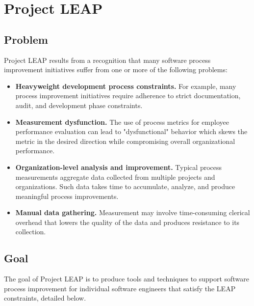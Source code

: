 
\chapter{Project LEAP}
\label{sec:LEAP}

\section{Problem}
Project LEAP results from a recognition that many software
process improvement initiatives suffer from one or more of
the following problems:
\begin{itemize}


\item{\bf Heavyweight development process constraints.}
For example, many process improvement initiatives require adherence to
strict documentation, audit, and development phase constraints.

\item{\bf Measurement dysfunction.} The use of process metrics for
employee performance evaluation can lead to "dysfunctional" behavior which
skews the metric in the desired direction while compromising overall
organizational performance.

\item{\bf Organization-level analysis and improvement.} Typical process
measurements aggregate data collected from multiple projects and
organizations. Such data takes time to accumulate, analyze, and produce
meaningful process improvements.

\item{\bf Manual data gathering.} Measurement may involve
time-consuming clerical overhead that lowers the quality of the data and
produces resistance to its collection.

\end{itemize}


\section{Goal}
The goal of Project LEAP is to produce tools and techniques to support 
software process improvement for individual software engineers that
satisfy the LEAP constraints, detailed below.

